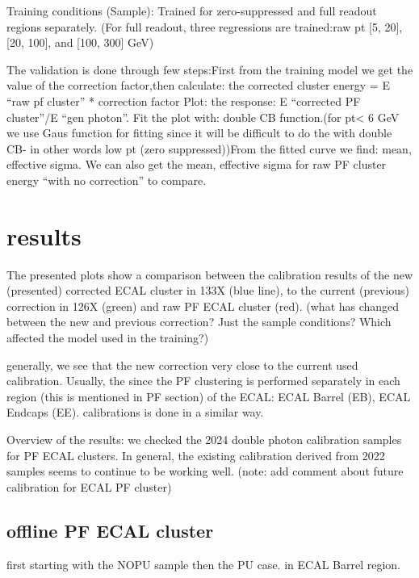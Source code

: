 Training conditions (Sample): Trained for zero-suppressed and full readout regions separately.
(For full readout, three regressions are trained:raw pt [5, 20], [20, 100], and [100, 300] GeV) 

The validation is done through few steps:First from the training model we get the value of the correction factor,then calculate: the corrected cluster energy = E “raw pf cluster” * correction factor 
Plot: the response: E “corrected PF cluster”/E “gen photon”. Fit the plot with: double CB function.(for pt< 6 GeV we use Gaus function for fitting since it will be difficult to do the with double CB- in other words low pt (zero suppressed))From the fitted curve we find: mean, effective sigma. We can also get the mean, effective sigma for raw PF cluster energy “with no correction” to compare. 

\section{results}

The presented plots show a comparison between the calibration results of the new (presented) corrected ECAL cluster in 133X (blue line), to the current (previous) correction in 126X (green) and raw PF ECAL cluster (red). (what has changed between the new and previous correction? Just the sample conditions? Which affected the model used in the training?)  

generally, we see that the new correction very close to the current used calibration. Usually, the since the PF clustering is performed separately in each region (this is mentioned in PF section) of the ECAL: ECAL Barrel (EB), ECAL Endcaps (EE). calibrations is done in a similar way.

Overview of the results: we checked the 2024 double photon calibration samples for PF ECAL clusters. In general, the existing calibration derived from 2022 samples seems to continue to be working well. (note: add comment about future calibration for ECAL PF cluster)


\subsection{offline PF ECAL cluster}

first starting with the NOPU sample then the PU case. in ECAL Barrel region. 

